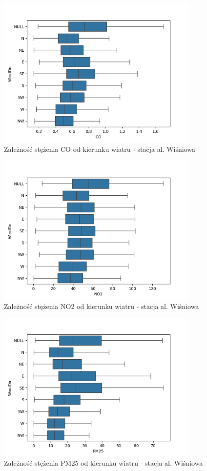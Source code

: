 \documentclass[18pt, letterpaper]{article}
\begin{document}
\begin{figure}[H]
\centering
\includegraphics[width=100mm, height=75mm]{visualisations/wind_dir_pollution_alt_patterns/wind_dir_CO.png}
\caption{Zależność stężenia CO od kierunku wiatru - stacja al. Wiśniowa}
\end{figure}

\begin{figure}[H]
\centering
\includegraphics[width=100mm, height=75mm]{visualisations/wind_dir_pollution_alt_patterns/wind_dir_NO2.png}
\caption{Zależność stężenia NO2 od kierunku wiatru - stacja al. Wiśniowa}
\end{figure}

\begin{figure}[H]
\centering
\includegraphics[width=100mm, height=75mm]{visualisations/wind_dir_pollution_alt_patterns/wind_dir_PM25.png}
\caption{Zależność stężenia PM25 od kierunku wiatru - stacja al. Wiśniowa}
\end{figure}
\end{document}
